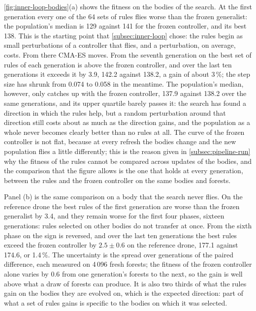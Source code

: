 \autoref{fig:inner-loop-bodies}(a) shows the fitness on the bodies of the search. At the first generation every one of the 64 sets of rules flies worse than the frozen generalist: the population's median is 129 against 141 for the frozen controller, and its best 138. This is the starting point that \autoref{subsec:inner-loop} chose: the rules begin as small perturbations of a controller that flies, and a perturbation, on average, costs. From there CMA-ES moves. From the seventh generation on the best set of rules of each generation is above the frozen controller, and over the last ten generations it exceeds it by 3.9, 142.2 against 138.2, a gain of about 3\,\%; the step size has shrunk from 0.074 to 0.058 in the meantime. The population's median, however, only catches up with the frozen controller, 137.9 against 138.2 over the same generations, and its upper quartile barely passes it: the search has found a direction in which the rules help, but a random perturbation around that direction still costs about as much as the direction gains, and the population as a whole never becomes clearly better than no rules at all. The curve of the frozen controller is not flat, because at every refresh the bodies change and the new population flies a little differently; this is the reason given in \autoref{subsec:pipeline-run} why the fitness of the rules cannot be compared across updates of the bodies, and the comparison that the figure allows is the one that holds at every generation, between the rules and the frozen controller on the same bodies and forests.

Panel (b) is the same comparison on a body that the search never flies. On the reference drone the best rules of the first generation are worse than the frozen generalist by 3.4, and they remain worse for the first four phases, sixteen generations: rules selected on other bodies do not transfer at once. From the sixth phase on the sign is reversed, and over the last ten generations the best rules exceed the frozen controller by $2.5 \pm 0.6$ on the reference drone, 177.1 against 174.6, or 1.4\,\%. The uncertainty is the spread over generations of the paired difference, each measured on 4\,096 fresh forests; the fitness of the frozen controller alone varies by 0.6 from one generation's forests to the next, so the gain is well above what a draw of forests can produce. It is also two thirds of what the rules gain on the bodies they are evolved on, which is the expected direction: part of what a set of rules gains is specific to the bodies on which it was selected.

